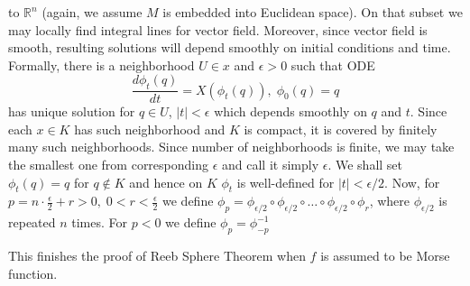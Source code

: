 \documentclass[8pt]{article} %
\newenvironment{proof}[1][Proof]{\begin{trivlist}
\item[\hskip \labelsep {\bfseries #1}]}{\qed\end{trivlist}}
\newcommand{\qed}{\nobreak \ifvmode \relax \else
\ifdim\lastskip<1.5em \hskip-\lastskip
\hskip1.5em plus0em minus0.5em \fi \nobreak
  \vrule height0.75em width0.5em depth0.25em\fi}
\begin{document}
\begin{proof}
	to $\mathbb{R}^n$ (again, we assume $M$ is embedded into Euclidean space). On that subset we may locally find integral lines for vector field. Moreover, since vector field is smooth, resulting solutions will depend
	smoothly on initial conditions and time. Formally, there is a neighborhood $U\in x$ and $\epsilon>0$ such that ODE
	\[\frac{d\phi_t(q)}{dt}=X(\phi_t(q)),\;\phi_0(q)=q\]
	has unique solution for $q\in U$, $|t|<\epsilon$ which depends smoothly on $q$ and $t$. Since each $x\in K$ has such neighborhood and $K$ is compact, it is covered by finitely many such neighborhoods. Since number
	of neighborhoods is finite, we may take the smallest one from corresponding $\epsilon$ and call it simply $\epsilon$. We shall set $\phi_t(q)=q$ for $q\notin K$ and hence on $K$ $\phi_t$ is well-defined for $|t|<\epsilon/2$.
	Now, for $p=n\cdot\frac{\epsilon}{2}+r>0,\;0<r<\frac{\epsilon}{2}$ we define $\phi_p=\phi_{\epsilon/2}\circ\phi_{\epsilon/2}\circ\dots\circ\phi_{\epsilon/2}\circ\phi_r$, where $\phi_{\epsilon/2}$ is repeated $n$ times.
	For $p<0$ we define $\phi_p=\phi_{-p}^{-1}$
\end{proof}
This finishes the proof of Reeb Sphere Theorem when $f$ is assumed to be Morse function.
\end{document}
